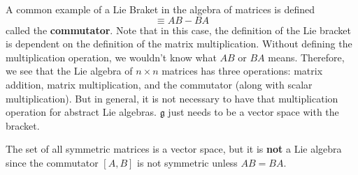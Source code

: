   \begin{example}
    A common example of a Lie Braket in the algebra of matrices is defined
    \begin{equation}
      [A, B] \equiv AB - BA
    \end{equation}
    called the \textbf{commutator}. Note that in this case, the definition of the Lie bracket is dependent on the definition of the matrix multiplication. Without defining the multiplication operation, we wouldn't know what $AB$ or $BA$ means. Therefore, we see that the Lie algebra of $n \times n$ matrices has three operations: matrix addition, matrix multiplication, and the commutator (along with scalar multiplication). But in general, it is not necessary to have that multiplication operation for abstract Lie algebras. $\mathfrak{g}$ just needs to be a vector space with the bracket.  
  \end{example}

  \begin{example}
    The set of all symmetric matrices is a vector space, but it is \textbf{not} a Lie algebra since the commutator $[A,B]$ is not symmetric unless $A B = B A$. 
  \end{example}

